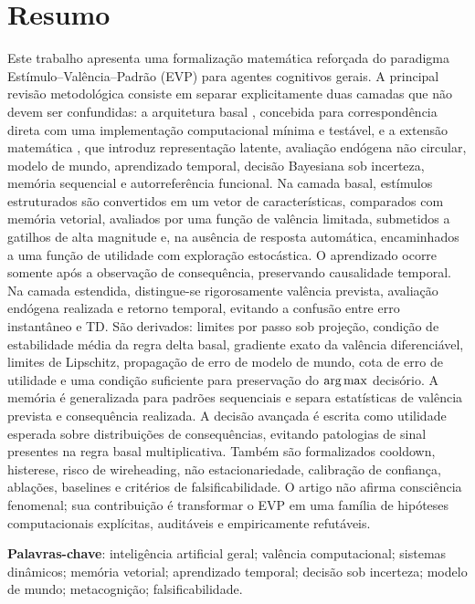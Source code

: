 \section*{Resumo}
\begin{singlespace}
Este trabalho apresenta uma formalização matemática reforçada do paradigma Estímulo--Valência--Padrão (EVP) para agentes cognitivos gerais. A principal revisão metodológica consiste em separar explicitamente duas camadas que não devem ser confundidas: a arquitetura basal \EVPB, concebida para correspondência direta com uma implementação computacional mínima e testável, e a extensão matemática \EVPM, que introduz representação latente, avaliação endógena não circular, modelo de mundo, aprendizado temporal, decisão Bayesiana sob incerteza, memória sequencial e autorreferência funcional. Na camada basal, estímulos estruturados são convertidos em um vetor de características, comparados com memória vetorial, avaliados por uma função de valência limitada, submetidos a gatilhos de alta magnitude e, na ausência de resposta automática, encaminhados a uma função de utilidade com exploração estocástica. O aprendizado ocorre somente após a observação de consequência, preservando causalidade temporal. Na camada estendida, distingue-se rigorosamente valência prevista, avaliação endógena realizada e retorno temporal, evitando a confusão entre erro instantâneo e TD. São derivados: limites por passo sob projeção, condição de estabilidade média da regra delta basal, gradiente exato da valência diferenciável, limites de Lipschitz, propagação de erro de modelo de mundo, cota de erro de utilidade e uma condição suficiente para preservação do \(\operatorname*{arg\,max}\) decisório. A memória é generalizada para padrões sequenciais e separa estatísticas de valência prevista e consequência realizada. A decisão avançada é escrita como utilidade esperada sobre distribuições de consequências, evitando patologias de sinal presentes na regra basal multiplicativa. Também são formalizados cooldown, histerese, risco de wireheading, não estacionariedade, calibração de confiança, ablações, baselines e critérios de falsificabilidade. O artigo não afirma consciência fenomenal; sua contribuição é transformar o EVP em uma família de hipóteses computacionais explícitas, auditáveis e empiricamente refutáveis.

\textbf{Palavras-chave}: inteligência artificial geral; valência computacional; sistemas dinâmicos; memória vetorial; aprendizado temporal; decisão sob incerteza; modelo de mundo; metacognição; falsificabilidade.
\end{singlespace}

